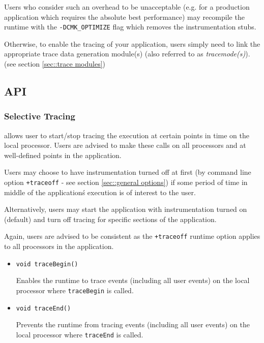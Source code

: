 \documentclass[10pt,dvips]{article}
\begin{document}
Users who consider such an overhead to be unacceptable (e.g. for a
production application which requires the absolute best performance)
may recompile the \charmpp{} runtime with the {\tt -DCMK\_OPTIMIZE}
flag which removes the instrumentation stubs.

Otherwise, to enable the tracing of your application, users simply
need to link the appropriate trace data generation module(s) (also
referred to as {\em tracemode(s)}). (see section \ref{sec::trace modules})

\subsection{\projections{} API}
\label{sec::api}

\subsubsection{Selective Tracing}
\label{sec::selective tracing}

\charmpp{} allows user to start/stop tracing the execution at certain
points in time on the local processor. Users are advised to make these
calls on all processors and at well-defined points in the application.

Users may choose to have instrumentation turned off at first (by
command line option {\tt +traceoff} - see section \ref{sec::general options}) if some period of time in middle of the
application\'s execution is of interest to the user.

Alternatively, users may start the application with instrumentation
turned on (default) and turn off tracing for specific sections of the
application.

Again, users are advised to be consistent as the {\tt +traceoff}
runtime option applies to all processors in the application.

\begin{itemize}
\item
{\tt void traceBegin()}

Enables the runtime to trace events (including all user events) on the local processor where {\tt traceBegin} is called.

\item
{\tt void traceEnd()}

Prevents the runtime from tracing events (including all user events) on the local processor where {\tt traceEnd} is called.

\end{itemize}
\end{document}
